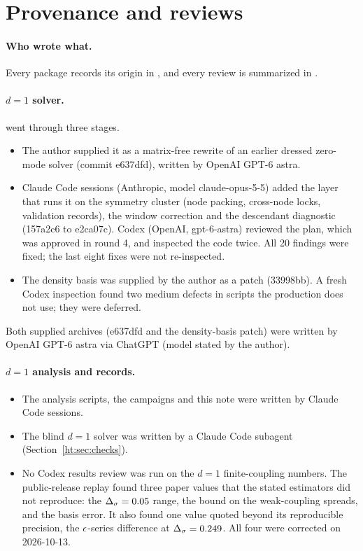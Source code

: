 \section{Provenance and reviews}\label{ht:app:prov}

\paragraph{Who wrote what.} Every package records its origin in , and every review is summarized
in .

\paragraph{$d=1$ solver.}  went through three stages.
\begin{itemize}
\item The author supplied it as a matrix-free rewrite of an earlier dressed zero-mode solver (commit e637dfd), written by
 OpenAI GPT-6 astra.
\item Claude Code sessions (Anthropic, model claude-opus-5-5) added the layer that runs it on the symmetry cluster
 (node packing, cross-node locks, validation records), the window correction and the descendant diagnostic
 (157a2c6 to e2ca07c). Codex (OpenAI, gpt-6-astra) reviewed the plan, which
 was approved in round 4, and inspected the code twice. All 20 findings were fixed; the last eight fixes were not
 re-inspected.
\item The density basis was supplied by the author as a patch (33998bb). A fresh Codex inspection found two medium
 defects in scripts the production does not use; they were deferred.
\end{itemize}
Both supplied archives (e637dfd and the density-basis patch) were written by OpenAI GPT-6 astra via ChatGPT (model stated by the author).

\paragraph{$d=1$ analysis and records.}
\begin{itemize}
\item The analysis scripts, the campaigns and this note were written by Claude Code sessions.
\item The blind $d=1$ solver was written by a Claude Code subagent (Section~\ref{ht:sec:checks}).
\item No Codex results review was run on the $d=1$ finite-coupling numbers. The public-release replay found three
 paper values that the stated estimators did not reproduce: the $\Delta_\sigma=0.05$ range, the bound on the weak-coupling
 spreads, and the basis error. It also found one value quoted beyond its reproducible precision, the $\epsilon$-series
 difference at $\Delta_\sigma=0.249$. All four were corrected on 2026-10-13.
\end{itemize}

